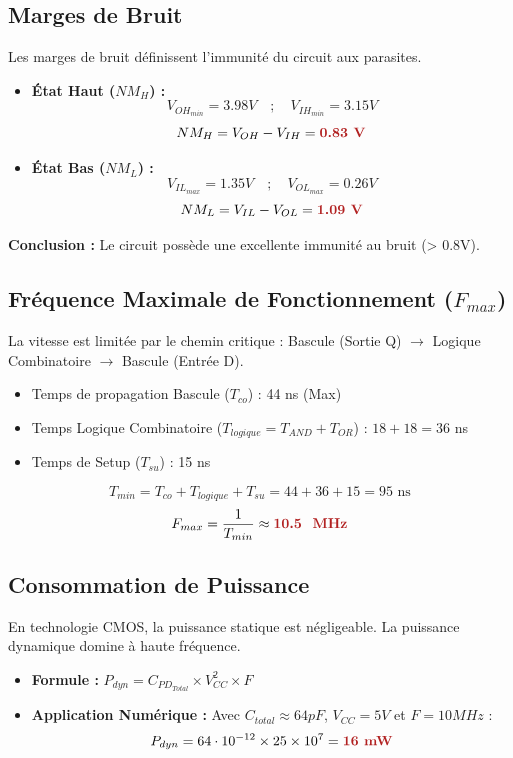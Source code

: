 \documentclass[12pt, a4paper]{article}
\newcommand{\motcle}[1]{\textcolor{HighlightRed}{\textbf{#1}}}
\begin{document}
\subsection{Marges de Bruit}
Les marges de bruit définissent l'immunité du circuit aux parasites.
\begin{itemize}
    \item \textbf{État Haut ($NM_H$) :}
    $$ V_{OH_{min}} = 3.98V \quad ; \quad V_{IH_{min}} = 3.15V $$
    $$ NM_H = V_{OH} - V_{IH} = \motcle{0.83 V} $$
    
    \item \textbf{État Bas ($NM_L$) :}
    $$ V_{IL_{max}} = 1.35V \quad ; \quad V_{OL_{max}} = 0.26V $$
    $$ NM_L = V_{IL} - V_{OL} = \motcle{1.09 V} $$
\end{itemize}
\textbf{Conclusion :} Le circuit possède une excellente immunité au bruit (> 0.8V).

\subsection{Fréquence Maximale de Fonctionnement ($F_{max}$)}
La vitesse est limitée par le chemin critique : Bascule (Sortie Q) $\rightarrow$ Logique Combinatoire $\rightarrow$ Bascule (Entrée D).

\begin{itemize}
    \item Temps de propagation Bascule ($T_{co}$) : 44 ns (Max)
    \item Temps Logique Combinatoire ($T_{logique} = T_{AND} + T_{OR}$) : $18 + 18 = 36$ ns
    \item Temps de Setup ($T_{su}$) : 15 ns
\end{itemize}

$$ T_{min} = T_{co} + T_{logique} + T_{su} = 44 + 36 + 15 = 95 \text{ ns} $$
$$ F_{max} = \frac{1}{T_{min}} \approx \motcle{10.5 \text{ MHz}} $$

\subsection{Consommation de Puissance}
En technologie CMOS, la puissance statique est négligeable. La puissance dynamique domine à haute fréquence.
\begin{itemize}
    \item \textbf{Formule :} $P_{dyn} = C_{PD_{Total}} \times V_{CC}^2 \times F$
    \item \textbf{Application Numérique :} 
    Avec $C_{total} \approx 64 pF$, $V_{CC}=5V$ et $F=10 MHz$ :
    $$ P_{dyn} = 64 \cdot 10^{-12} \times 25 \times 10^7 = \motcle{16 mW} $$
\end{itemize}
\end{document}
